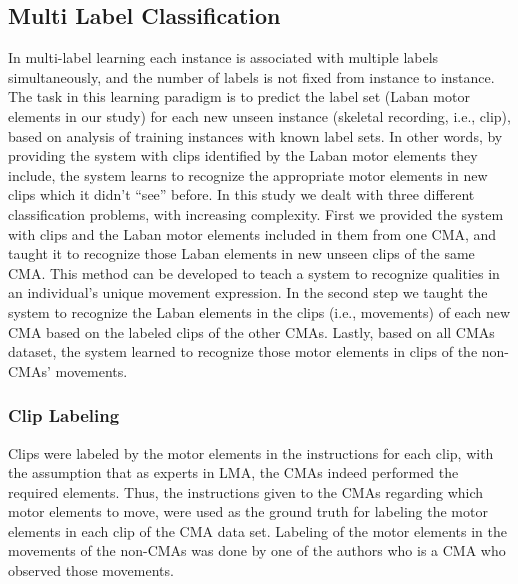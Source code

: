 \subsection{Multi Label Classification}
In multi-label learning each instance is associated with multiple labels
simultaneously, and the number of labels is not fixed from instance to instance. 
The task in this learning paradigm is to predict the label set (Laban motor elements 
in our study) for each new unseen instance (skeletal recording, i.e., clip), based on 
analysis of training instances with known label sets. In other words, by providing the 
system with clips identified by the Laban motor elements they include, the system 
learns to recognize the appropriate motor elements in new clips which it didn't
``see'' before. In this study we dealt with three different classification problems, 
with increasing complexity. 
First we provided the system with clips and the Laban motor elements included 
in them from one CMA, and taught it to recognize those Laban elements in new unseen clips 
of the same CMA. This method can be developed to teach a system to recognize qualities 
in an individual's unique movement expression. In the second step we taught the
system to recognize the Laban elements in the clips (i.e., movements) of each new CMA 
based on the labeled clips of the other CMAs. Lastly, based on all CMAs dataset, the system 
learned to recognize those motor elements in clips of the non-CMAs' movements. 
\subsubsection{Clip Labeling}
Clips were labeled by the motor elements in the instructions for each clip, with
the assumption that as experts in LMA, the CMAs indeed performed the required elements. 
Thus, the instructions given to the CMAs regarding which motor elements to move, 
were used as the ground truth for labeling the motor elements in each clip of the CMA data set. 
Labeling of the motor elements in the movements of the non-CMAs was done by one of the authors 
who is a CMA who observed those movements.
